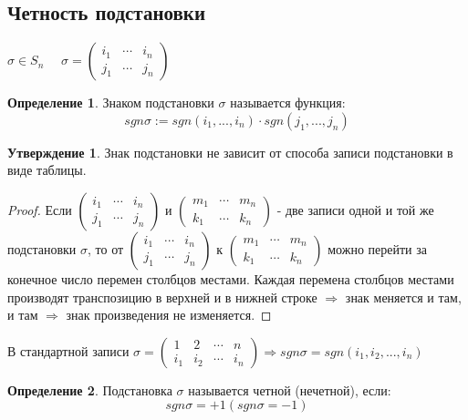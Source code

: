 \documentclass[a4paper, 12pt]{article}
\theoremstyle{definition}
\newtheorem*{definition}{Определение}
\newtheorem*{subtheorem}{Утверждение}
\begin{document}
  \subsection{Четность подстановки}
  $\sigma \in S_n$ \ \ $\sigma = \begin{pmatrix}
    i_1 & \cdots & i_n \\
    j_1 & \cdots & j_n
  \end{pmatrix}$  
  \begin{definition}
    Знаком подстановки $\sigma$ называется функция: 
    $$sgn \sigma:= sgn(i_1,...,i_n)\cdot sgn(j_1,...,j_n)$$  
  \end{definition} 
  \begin{subtheorem}
    Знак подстановки не зависит от способа записи подстановки в виде таблицы.
  \end{subtheorem} 
  \begin{proof}
    Если $\begin{pmatrix}
    i_1 & \cdots & i_n \\
    j_1 & \cdots & j_n
  \end{pmatrix}$ и $\begin{pmatrix}
    m_1 & \cdots & m_n \\
    k_1 & \cdots & k_n
  \end{pmatrix}$ - две записи одной и той же подстановки $\sigma$, то от $\begin{pmatrix}
    i_1 & \cdots & i_n \\
    j_1 & \cdots & j_n
  \end{pmatrix}$ к $\begin{pmatrix}
    m_1 & \cdots & m_n \\
    k_1 & \cdots & k_n
  \end{pmatrix}$ можно перейти за конечное число перемен столбцов местами. Каждая перемена столбцов местами производят транспозицию в верхней и в нижней строке $\Longrightarrow $ знак меняется и там, и там $\Longrightarrow $ знак произведения не изменяется. 
  \end{proof} 
  В стандартной записи $\sigma = \begin{pmatrix}
    1 & 2 & \cdots & n \\
    i_1 & i_2 & \cdots & i_n
  \end{pmatrix} \Longrightarrow sgn \sigma = sgn (i_1,i_2,...,i_n)$  
  \begin{definition}
    Подстановка $\sigma$ называется четной (нечетной), если: 
    $$sgn \sigma = +1 (sgn \sigma = -1)$$  
  \end{definition} 
\end{document}
